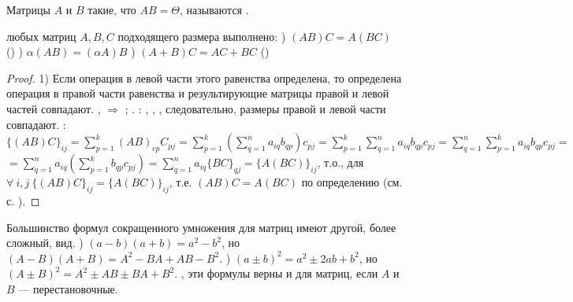 \begin{opred}
Матрицы $A$ и $B$ такие, что $AB=\Theta$, называются .
\end{opred}
\begin{theor}
 любых матриц $A,B,C$ подходящего размера выполнено:
) $(AB)C=A(BC)$ ()
) $\alpha(AB)=(\alpha{}A)B$
) $(A+B)C=AC+BC$ ()
\end{theor}
\begin{proof}
1) Если операция в левой части этого равенства определена, то определена операция в правой части равенства и результирующие матрицы правой и левой частей совпадают.
 ,  $\Rightarrow$ ; .
: , , , следовательно, размеры правой и левой части совпадают.
: $\{(AB)C\}_{ij}=\sum\limits_{p=1}^k(AB)_{cp}C_{pj}=\sum\limits_{p=1}^k(\sum\limits_{q=1}^na_{iq}b_{qp})c_{pj}=\sum\limits_{p=1}^k\sum\limits_{q=1}^na_{iq}b_{qp}c_{pj}=\sum\limits_{q=1}^n\sum\limits_{p=1}^ka_{iq}b_{qp}c_{pj}=$\newline$=\sum\limits_{q=1}^na_{iq}(\sum\limits_{p=1}^kb_{qp}c_{pj})=\sum\limits_{q=1}^na_{iq}\{BC\}_{qj}=\{A(BC)\}_{ij}$, т.о., для $\forall\ i,j\ \{(AB)C\}_{ij}=\{A(BC)\}_{ij}$, т.е. \newline$(AB)C=A(BC)$ по определению (см. с. \pageref{eq_matrices}).
\newline{}
\end{proof}
\begin{remark}
Большинство формул сокращенного умножения для матриц имеют другой, более сложный, вид.
) $(a-b)(a+b)=a^2-b^2$, но $(A-B)(A+B)=A^2-BA+AB-B^2$.
) $(a\pm{}b)^2=a^2\pm{}2ab+b^2$, но $(A\pm{}B)^2=A^2\pm{}AB\pm{}BA+B^2$.
, эти формулы верны и для матриц, если $A$ и $B$ --- перестановочные.
\end{remark}
